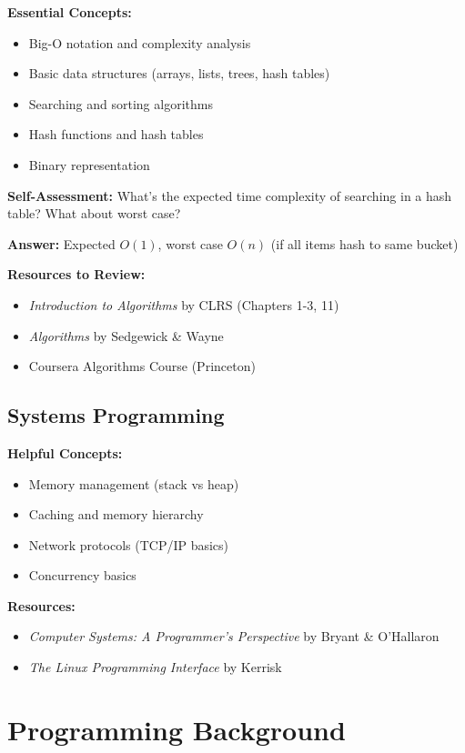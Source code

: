 \textbf{Essential Concepts:}
\begin{itemize}
\item Big-O notation and complexity analysis
\item Basic data structures (arrays, lists, trees, hash tables)
\item Searching and sorting algorithms
\item Hash functions and hash tables
\item Binary representation
\end{itemize}

\textbf{Self-Assessment:}
What's the expected time complexity of searching in a hash table? What about worst case?

\textbf{Answer:} Expected $O(1)$, worst case $O(n)$ (if all items hash to same bucket)

\textbf{Resources to Review:}
\begin{itemize}
\item \textit{Introduction to Algorithms} by CLRS (Chapters 1-3, 11)
\item \textit{Algorithms} by Sedgewick \& Wayne
\item Coursera Algorithms Course (Princeton)
\end{itemize}

\subsection{Systems Programming}

\textbf{Helpful Concepts:}
\begin{itemize}
\item Memory management (stack vs heap)
\item Caching and memory hierarchy
\item Network protocols (TCP/IP basics)
\item Concurrency basics
\end{itemize}

\textbf{Resources:}
\begin{itemize}
\item \textit{Computer Systems: A Programmer's Perspective} by Bryant \& O'Hallaron
\item \textit{The Linux Programming Interface} by Kerrisk
\end{itemize}

\section{Programming Background}

